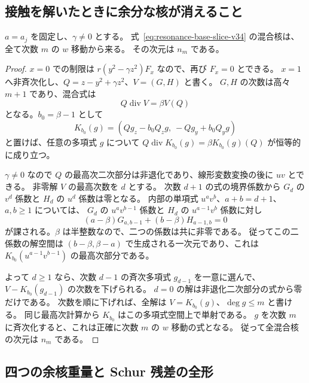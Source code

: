 \subsection{接触を解いたときに余分な核が消えること}

\begin{lemma}
\label{lem:resonance-transverse-kernel-v34}
$a=a_j$ を固定し、$\gamma\ne0$ とする。
式~\eqref{eq:resonance-base-slice-v34} の混合核は、全て次数 $m$ の $w$ 移動から来る。
その次元は $n_m$ である。
\end{lemma}

\begin{proof}
$x=0$ での制限は $r(y^2-\gamma z^2)F_x$ なので、再び $F_x=0$ とできる。
$x=1$ へ非斉次化し、$Q=z-y^2+\gamma z^2$、$V=(G,H)$ と書く。
$G,H$ の次数は高々 $m+1$ であり、混合式は
\begin{equation}
 Q\operatorname{div}V=\beta V(Q)
 \label{eq:resonance-affine-log-v34}
\end{equation}
となる。$b_0=\beta-1$ として
\[
 K_{b_0}(g)=(Qg_z-b_0Q_zg,\ -Qg_y+b_0Q_yg)
\]
と置けば、任意の多項式 $g$ について
$Q\operatorname{div}K_{b_0}(g)=\beta K_{b_0}(g)(Q)$ が恒等的に成り立つ。

$\gamma\ne0$ なので $Q$ の最高次二次部分は非退化であり、線形変数変換の後に $uv$ とできる。
非零解 $V$ の最高次数を $d$ とする。
次数 $d+1$ の式の境界係数から $G_d$ の $v^d$ 係数と $H_d$ の $u^d$ 係数は零となる。
内部の単項式 $u^av^b$、$a+b=d+1$、$a,b\geq1$ については、
$G_d$ の $u^av^{b-1}$ 係数と $H_d$ の $u^{a-1}v^b$ 係数に対し
\[
 (a-\beta)G_{a,b-1}+(b-\beta)H_{a-1,b}=0
\]
が課される。$\beta$ は半整数なので、二つの係数は共に非零である。
従ってこの二係数の解空間は
$(b-\beta,\beta-a)$ で生成される一次元であり、これは
$K_{b_0}(u^{a-1}v^{b-1})$ の最高次部分である。

よって $d\geq1$ なら、次数 $d-1$ の斉次多項式 $g_{d-1}$ を一意に選んで、
$V-K_{b_0}(g_{d-1})$ の次数を下げられる。
$d=0$ の解は非退化二次部分の式から零だけである。
次数を順に下げれば、全解は $V=K_{b_0}(g)$、$\deg g\leq m$ と書ける。
同じ最高次計算から $K_{b_0}$ はこの多項式空間上で単射である。
$g$ を次数 $m$ に斉次化すると、これは正確に次数 $m$ の $w$ 移動の式となる。
従って全混合核の次元は $n_m$ である。
\end{proof}

\subsection{四つの余核重量と Schur 残差の全形}

